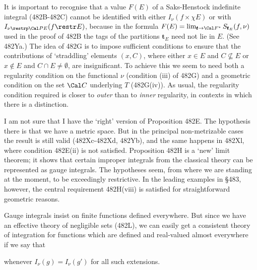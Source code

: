 {It is important to recognise that a value $F(E)$ of a Saks-Henstock
indefinite integral (482B-482C) cannot be
identified with either $I_{\nu}(f\times\chi E)$ or with
$I_{\nu\restrp\Cal PE}(f\restr E)$, because in the formula
$F(E)=\lim_{\pmb{t}\to\Cal F^*}S_{\pmb{t}_E}(f,\nu)$ used in the proof of
482B the tags of the
partitions $\pmb{t}_E$ need not lie in $E$.   (See 482Ya.)
The idea of 482G is
to impose sufficient conditions to ensure that the contributions of
`straddling' elements $(x,C)$, where either $x\in E$ and
$C\not\subseteq E$ or $x\notin E$ and $C\cap E\ne\emptyset$, are
insignificant.   To achieve this we seem to need both a regularity
condition on the functional $\nu$ (condition (iii) of 482G)
and a geometric condition on the set $\Cal C$ underlying $T$ (482G(iv)).
As usual,
the regularity condition required is closer to {\it outer} than to
{\it inner} regularity, in contexts in which there is a distinction.

I am not sure that I have the `right' version of Proposition 482E.
The hypothesis there is that we have a metric space.   But in the
principal
non-metrizable cases the result is still valid (482Xc-482Xd, 482Yb),
and the same happens in 482Xl, where condition 482E(ii) is not
satisfied.
Proposition 482H is a `new' limit theorem;  it shows that certain improper
integrals from the classical theory can be represented as gauge integrals.
The hypotheses seem, from where we
are standing at the moment, to be exceedingly restrictive.   In the
leading examples in \S483, however, the central requirement 482H(viii) is
satisfied for straightforward geometric reasons.

Gauge integrals insist on finite functions defined everywhere.   But
since we have an effective theory of negligible sets (482L), we can
easily get a consistent theory of integration for functions which are
defined and real-valued almost everywhere if we say that


\noindent whenever $I_{\nu}(g)=I_{\nu}(g')$ for all such extensions.
}%

\discrpage

